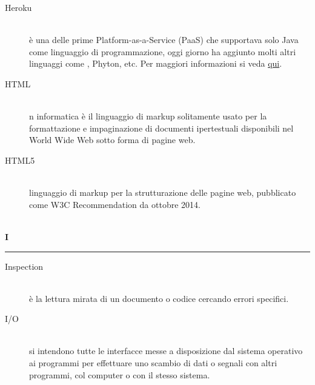 \documentclass[12pt,a4paper]{article}
\begin{document}
\begin{description}
\item[Heroku] 
\hfill\\ è una  delle prime  Platform-as-a-Service (PaaS) che supportava solo Java come linguaggio di programmazione, oggi giorno ha aggiunto molti altri linguaggi come , Phyton, etc. Per maggiori informazioni si veda \href{https://www.heroku.com}{qui}.

\item[HTML] 
\hfill\\ n informatica è il linguaggio di markup solitamente usato per la formattazione e impaginazione di documenti ipertestuali disponibili nel World Wide Web sotto forma di pagine web.

\item[HTML5] 
\hfill\\ linguaggio di markup per la strutturazione delle pagine web, pubblicato come W3C Recommendation da ottobre 2014.
\end{description}
\newpage

\begin{center}
\hfill\\
	\LARGE \textbf{I}
\hfill\\
\rule[15pt]{30pt}{0.5pt}
\end{center}

\begin{description}
\item[Inspection] 
\hfill\\ è la lettura mirata di un documento o codice cercando errori specifici.

\item[I/O] 
\hfill\\si intendono tutte le interfacce messe a disposizione dal sistema operativo ai programmi per effettuare uno scambio di dati o segnali con altri programmi, col computer o con il stesso sistema.
\end{description}

\newpage
\end{document}
